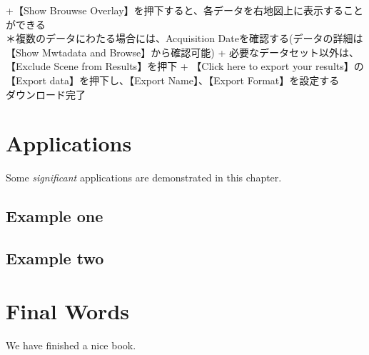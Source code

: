 \documentclass[
]{book}
\begin{document}
+【Show Brouwse Overlay】を押下すると、各データを右地図上に表示することができる\\
＊複数のデータにわたる場合には、Acquisition Dateを確認する(データの詳細は【Show Mwtadata and Browse】から確認可能)
+ 必要なデータセット以外は、【Exclude Scene from Results】を押下
+ 【Click here to export your results】の【Export data】を押下し、【Export Name】、【Export Format】を設定する\\
ダウンロード完了

\hypertarget{applications}{%
\chapter{Applications}\label{applications}}

Some \emph{significant} applications are demonstrated in this chapter.

\hypertarget{example-one}{%
\section{Example one}\label{example-one}}

\hypertarget{example-two}{%
\section{Example two}\label{example-two}}

\hypertarget{final-words}{%
\chapter{Final Words}\label{final-words}}

We have finished a nice book.

  
\end{document}
